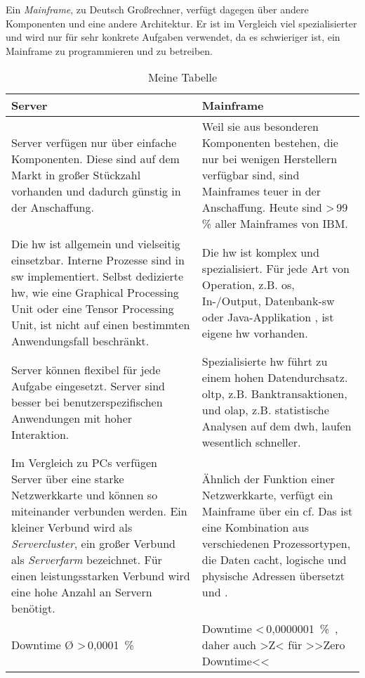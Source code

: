 Ein \emph{Mainframe}, zu Deutsch Großrechner, verfügt dagegen über andere Komponenten und eine andere Architektur. Er ist im Vergleich viel spezialisierter und wird nur für sehr konkrete Aufgaben verwendet, da es schwieriger ist, ein Mainframe zu programmieren und zu betreiben.
\begin{table}[H]
    \centering
    \begin{tabularx}{\textwidth}{|X|X|}
        \hline
        \textbf{Server} & \textbf{Mainframe} \\
        \hline
        Server verfügen nur über einfache Komponenten. Diese sind auf dem Markt in großer Stückzahl vorhanden und dadurch günstig in der Anschaffung.
        &
        Weil sie aus besonderen Komponenten bestehen, die nur bei wenigen Herstellern verfügbar sind, sind Mainframes teuer in der Anschaffung. Heute sind >\,99 \% aller Mainframes von IBM.
        \\
        \hline
        Die \ac{hw} ist allgemein und vielseitig einsetzbar. Interne Prozesse sind in \ac{sw} implementiert. Selbst dedizierte \ac{hw}, wie eine Graphical Processing Unit oder eine Tensor Processing Unit, ist nicht auf einen bestimmten Anwendungsfall beschränkt.
        &
        Die \ac{hw} ist komplex und spezialisiert. Für jede Art von Operation, z.B. \ac{os}, In-/Output, Datenbank-\ac{sw} oder Java-Applikation \cite{redbook.1}, ist eigene \ac{hw} vorhanden.
        \\
        \hline
        Server können flexibel für jede Aufgabe eingesetzt. Server sind besser bei benutzerspezifischen Anwendungen mit hoher Interaktion.
        &
        Spezialisierte \ac{hw} führt zu einem hohen Datendurchsatz. \ac{oltp}, z.B. Banktransaktionen, und \ac{olap}, z.B. statistische Analysen auf dem \ac{dwh}, laufen wesentlich schneller.
        \\
        \hline
        Im Vergleich zu PCs verfügen Server über eine starke Netzwerkkarte und können so miteinander verbunden werden. Ein kleiner Verbund wird als \emph{Servercluster}, ein großer Verbund als \emph{Serverfarm} bezeichnet. Für einen leistungsstarken Verbund wird eine hohe Anzahl an Servern benötigt.
        &
        Ähnlich der Funktion einer Netzwerkkarte, verfügt ein Mainframe über ein \ac{cf}. Das ist eine Kombination aus verschiedenen Prozessortypen, die Daten cacht, logische und physische Adressen übersetzt und .
        \\
        \hline
        Downtime Ø >\,0,0001~\%
        &
        Downtime <\,0,0000001~\%~\cite{itic}, daher auch >Z< für >>Zero Downtime<<
        \\
        \hline
    \end{tabularx}
    \caption{Meine Tabelle}
\end{table}


